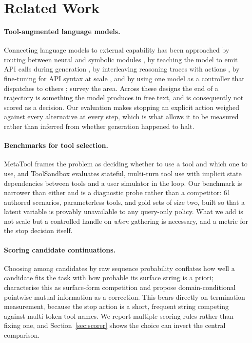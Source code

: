 \documentclass[11pt]{article}
\begin{document}
\section{Related Work}

\paragraph{Tool-augmented language models.}
Connecting language models to external capability has been approached by routing
between neural and symbolic modules \citep{karpas2022mrkl}, by teaching the model
to emit API calls during generation \citep{schick2023toolformer}, by interleaving
reasoning traces with actions \citep{yao2022react}, by fine-tuning for API syntax
at scale \citep{patil2023gorilla,qin2023toolllm}, and by using one model as a
controller that dispatches to others \citep{shen2023hugginggpt};
\citet{mialon2023augmented} survey the area. Across these designs the end of a
trajectory is something the model produces in free text, and is consequently not
scored as a decision. Our evaluation makes stopping an explicit action weighed
against every alternative at every step, which is what allows it to be measured
rather than inferred from whether generation happened to halt.

\paragraph{Benchmarks for tool selection.}
MetaTool \citep{huang2023metatool} frames the problem as deciding whether to use a
tool and which one to use, and ToolSandbox \citep{lu2024toolsandbox} evaluates
stateful, multi-turn tool use with implicit state dependencies between tools and a
user simulator in the loop. Our benchmark is narrower than either and is a
diagnostic probe rather than a competitor: 61 authored scenarios, parameterless
tools, and gold sets of size two, built so that a latent variable is provably
unavailable to any query-only policy. What we add is not scale but a controlled
handle on \emph{when} gathering is necessary, and a metric for the stop decision
itself.

\paragraph{Scoring candidate continuations.}
Choosing among candidates by raw sequence probability conflates how well a
candidate fits the task with how probable its surface string is a priori;
\citet{holtzman2021surface} characterise this as surface-form competition and
propose domain-conditional pointwise mutual information as a correction. This bears
directly on termination measurement, because the stop action is a short, frequent
string competing against multi-token tool names. We report multiple scoring rules
rather than fixing one, and Section~\ref{sec:scorer} shows the choice can invert
the central comparison.
\end{document}
